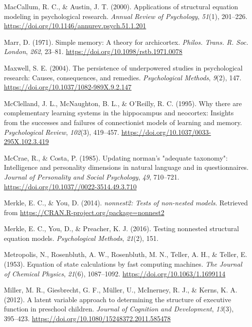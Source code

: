 \documentclass[
  man,floatsintext]{apa6}
\newlength{\cslhangindent}
\newlength{\cslentryspacingunit} %
\newenvironment{CSLReferences}[2] %
 {%
  \setlength{\parindent}{0pt}
  \ifodd #1
  \let\oldpar\par
  \def\par{\hangindent=\cslhangindent\oldpar}
  \fi
  \setlength{\parskip}{#2\cslentryspacingunit}
 }%
 {}
\begin{document}
\begin{CSLReferences}{1}{0}
\leavevmode{}%
MacCallum, R. C., \& Austin, J. T. (2000). Applications of structural equation modeling in psychological research. \emph{Annual Review of Psychology}, \emph{51}(1), 201--226. \url{https://doi.org/10.1146/annurev.psych.51.1.201}

\leavevmode{}%
Marr, D. (1971). Simple memory: A theory for archicortex. \emph{Philos. Trans. R. Soc. London}, \emph{262}, 23--81. \url{https://doi.org/10.1098/rstb.1971.0078}

\leavevmode{}%
Maxwell, S. E. (2004). The persistence of underpowered studies in psychological research: Causes, consequences, and remedies. \emph{Psychological Methods}, \emph{9}(2), 147. \url{https://doi.org/10.1037/1082-989X.9.2.147}

\leavevmode{}%
McClelland, J. L., McNaughton, B. L., \& O'Reilly, R. C. (1995). Why there are complementary learning systems in the hippocampus and neocortex: Insights from the successes and failures of connectionist models of learning and memory. \emph{Psychological Review}, \emph{102}(3), 419--457. \url{https://doi.org/10.1037/0033-295X.102.3.419}

\leavevmode{}%
McCrae, R., \& Costa, P. (1985). Updating norman's "adequate taxonomy": Intelligence and personality dimensions in natural language and in questionnaires. \emph{Journal of Personality and Social Psychology}, \emph{49}, 710--721. \url{https://doi.org/10.1037//0022-3514.49.3.710}

\leavevmode{}%
Merkle, E. C., \& You, D. (2014). \emph{nonnest2: Tests of non-nested models}. Retrieved from \url{https://CRAN.R-project.org/package=nonnest2}

\leavevmode{}%
Merkle, E. C., You, D., \& Preacher, K. J. (2016). Testing nonnested structural equation models. \emph{Psychological Methods}, \emph{21}(2), 151.

\leavevmode{}%
Metropolis, N., Rosenbluth, A. W., Rosenbluth, M. N., Teller, A. H., \& Teller, E. (1953). Equation of state calculations by fast computing machines. \emph{The Journal of Chemical Physics}, \emph{21}(6), 1087--1092. \url{https://doi.org/10.1063/1.1699114}

\leavevmode{}%
Miller, M. R., Giesbrecht, G. F., Müller, U., McInerney, R. J., \& Kerns, K. A. (2012). A latent variable approach to determining the structure of executive function in preschool children. \emph{Journal of Cognition and Development}, \emph{13}(3), 395--423. \url{https://doi.org/10.1080/15248372.2011.585478}


\end{CSLReferences}
\end{document}
